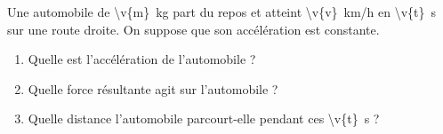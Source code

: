 Une automobile de \qty{\v{m}}{kg} part du repos et atteint \qty{\v{v}}{km/h} en \qty{\v{t}}{s} sur une route droite. On suppose que son accélération est constante.

\begin{enumerate}[label=\alph*)]
    \item Quelle est l'accélération de l'automobile ?
    \item Quelle force résultante agit sur l'automobile ?
    \item Quelle distance l'automobile parcourt-elle pendant ces \qty{\v{t}}{s} ?
\end{enumerate}
